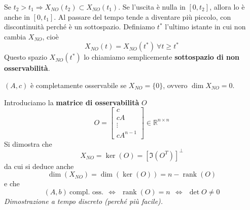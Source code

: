 \documentclass[10pt,a4paper]{book}
\DeclareMathOperator{\rank}{rank}
\begin{document}
Se $t_2  >t_1 \Rightarrow X_{NO}(t_2) \subset X_{NO}(t_1)$. Se l'uscita è nulla in $[ 0,t_2]$, allora lo è anche in $[ 0,t_1]$. Al passare del tempo tende a diventare più piccolo, con discontinuità perché è un sottospazio. Definiamo $t^{*}$ l'ultimo istante in cui non cambia $X_{NO}$, cioè
\begin{equation*}
	X_{NO}(t) =X_{NO}\left(t^{*}\right) \ \forall t\geqslant t^{*}
\end{equation*}
Questo spazio $X_{NO}\left(t^{*}\right)$ lo chiamiamo semplicemente \textbf{sottospazio di non osservabilità}.
\begin{definition}
	$(A,c)$ è completamente osservabile se $X_{NO} =\{0\}$, ovvero $\dim X_{NO} =0$.
\end{definition}
Introduciamo la \textbf{matrice di osservabilità} $O$
\begin{equation*}
	\boxed{O=\begin{bmatrix}
		c\\
		cA\\
		\vdots \\
		cA^{n-1}
		\end{bmatrix} \in \mathbb{R}^{n\times n}
	}
\end{equation*}
Si dimostra che
\begin{equation*}
	X_{NO} =\ker(O) =\left[\Im\left(O^T\right)\right]^{\perp }
\end{equation*}
da cui si deduce anche
\begin{equation*}
	\dim(X_{NO}) =\dim(\ker(O)) =n-\rank(O)
\end{equation*}
e che
\begin{equation*}
	(A,b) \ \text{compl. oss.} \ \ \Leftrightarrow \ \ \rank(O) =n\ \ \Leftrightarrow \ \ \det O\neq 0
\end{equation*}
\textit{Dimostrazione a tempo discreto (perché più facile).}
\end{document}
